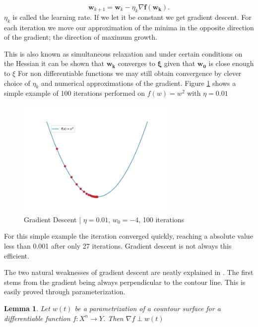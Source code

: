 \documentclass{article}
\newtheorem{lemma}[theorem]{Lemma}
\begin{document}
\begin{equation} \label{eq:1}
\mathbf{w}_{k+1} = \mathbf{w}_k - \eta_k \nabla  \mathbf{f(\mathbf{w}_k)}.
\end{equation}
$\eta_k$ is called the learning rate. If we let it be constant we get gradient descent. For each iteration we move our approximation of the minima in the opposite direction of the gradient; the direction of maximum growth. 

This is also known as simultaneous relaxation and under certain conditions on the Hessian it can be shown that 
$\mathbf{w_k}$ converges to $\mathbf{\xi}$  given that $\mathbf{w_0}$ is close enough to $\xi$ \cite[p.~117--118]{introNumeric}
For non differentiable functions we may still obtain convergence by clever choice of $\eta_k$ and numerical approximations of the gradient. 
Figure \ref{fig:simple_gradient_descent} shows a simple example of 100 iterations performed on $f(w) = w^2$ with $\eta = 0.01$

\begin{figure}[H]
    \centering
    \includegraphics[width=0.68\textwidth]{Project2/figures/simple_gradient_descent.png}
    \caption{Gradient Descent | $\eta = 0.01$, $w_0 = -4$, 100 iterations}
    \label{fig:simple_gradient_descent}
\end{figure}
For this simple example the iteration converged quickly, reaching a absolute value less than 0.001 after only 27 iterations. Gradient descent is not always this efficient. 

The two natural weaknesses of gradient descent are neatly explained in \cite[p.~65--71]{MLRefined}. The first stems from the gradient being always perpendicular to the contour line. This is easily proved through parameterization.


\begin{lemma}
    Let $w(t)$ be a parametrization of a countour surface for a differentiable function $f: X^n \rightarrow Y$. Then $\nabla f \perp w(t) $ 
\end{lemma}
\end{document}
